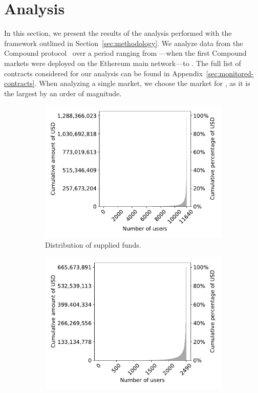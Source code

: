 \section{Analysis}
\label{sec:analysis}
In this section, we present the results of the analysis performed with the framework outlined in Section~\ref{sec:methodology}.
We analyze data from the Compound protocol~\cite{Leshner2018} over a period ranging from \StartDate---when the first Compound markets were deployed on the Ethereum main network---to \EndDate.
The full list of contracts considered for our analysis can be found in Appendix~\ref{sec:monitored-contracts}.
When analyzing a single market, we choose the market for , as it is the largest by an order of magnitude.

\begin{figure}[tbp]
  \begin{subfigure}{.5\textwidth}
    \centering
    \includegraphics[width=\textwidth]{./5b-economic-security/figures/suppliers-distribution.pdf}
    \caption{Distribution of supplied funds.}
    \label{fig:suppliers-distribution}
  \end{subfigure}
  \begin{subfigure}{.5\textwidth}
    \centering
    \includegraphics[width=\textwidth]{./5b-economic-security/figures/borrowers-distribution.pdf}

\end{subfigure}
\end{figure}
